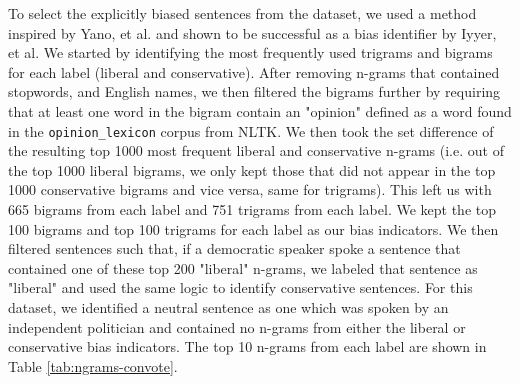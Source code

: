 \documentclass[10pt,a4paper,onecolumn]{article}
\begin{document}
To select the explicitly biased sentences from the dataset, we used a method inspired by Yano, et al. \cite{YanoBigrams} and shown to be successful as a bias identifier by Iyyer, et al. \cite{iyyerRNN} We started by identifying the most frequently used trigrams and bigrams for each label (liberal and conservative). After removing n-grams that contained stopwords, and English names, we then filtered the bigrams further by requiring that at least one word in the bigram contain an "opinion" defined as a word found in the \texttt{opinion\_lexicon} corpus from NLTK. We then took the set difference of the resulting top 1000 most frequent liberal and conservative n-grams (i.e. out of the top 1000 liberal bigrams, we only kept those that did not appear in the top 1000 conservative bigrams and vice versa, same for trigrams). This left us with 665 bigrams from each label and 751 trigrams from each label. We kept the top 100 bigrams and top 100 trigrams for each label as our bias indicators. We then filtered sentences such that, if a democratic speaker spoke a sentence that contained one of these top 200 "liberal" n-grams, we labeled that sentence as "liberal" and used the same logic to identify conservative sentences. For this dataset, we identified a neutral sentence as one which was spoken by an independent politician and contained no n-grams from either the liberal or conservative bias indicators. The top 10 n-grams from each label are shown in Table \ref{tab:ngrams-convote}.
\end{document}
